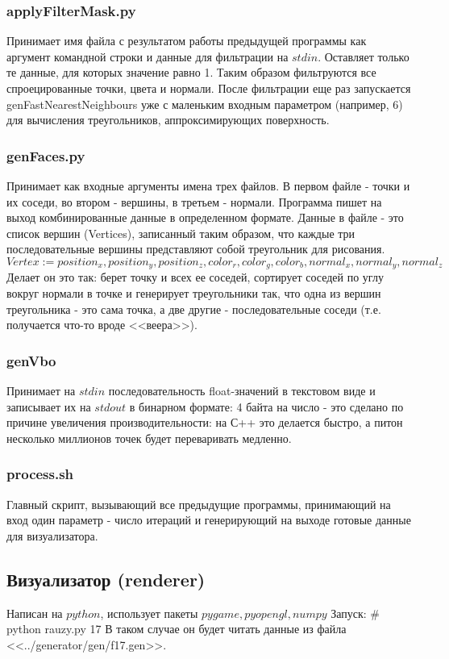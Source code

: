 \documentclass{article}
\begin{document}
\subsubsection{applyFilterMask.py}
Принимает имя файла с результатом работы предыдущей программы как аргумент командной строки и данные для фильтрации на $stdin$. Оставляет только те данные, для которых значение равно 1. Таким образом фильтруются все спроецированные точки, цвета и нормали. После фильтрации еще раз запускается genFastNearestNeighbours уже с маленьким входным параметром (например, 6) для вычисления треугольников, аппроксимирующих поверхность.

\subsubsection{genFaces.py}
Принимает как входные аргументы имена трех файлов. В первом файле - точки и их соседи, во втором - вершины, в третьем - нормали. Программа пишет на выход комбинированные данные в определенном формате.
Данные в файле - это список вершин (Vertices), записанный таким образом, что каждые три последовательные вершины представляют собой треугольник для рисования.
$$Vertex := position_x, position_y, position_z, color_r, color_g, color_b, normal_x, normal_y, normal_z$$
Делает он это так: берет точку и всех ее соседей, сортирует соседей по углу вокруг нормали в точке и генерирует треугольники так, что одна из вершин треугольника - это сама точка, а две другие - последовательные соседи (т.е. получается что-то вроде <<веера>>).

\subsubsection{genVbo}
Принимает на $stdin$ последовательность float-значений в текстовом виде и записывает их на $stdout$ в бинарном формате: 4 байта на число - это сделано по причине увеличения производительности: на С++ это делается быстро, а питон несколько миллионов точек будет переваривать медленно.

\subsubsection{process.sh}
Главный скрипт, вызывающий все предыдущие программы, принимающий на вход один параметр - число итераций и генерирующий на выходе готовые данные для визуализатора.

\subsection{Визуализатор (renderer)}
Написан на $python$, использует пакеты $pygame, pyopengl, numpy$
Запуск:
\# python rauzy.py 17
В таком случае он будет читать данные  из файла <<../generator/gen/f17.gen>>.
\end{document}
